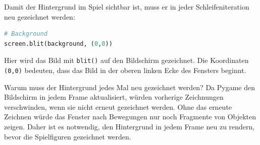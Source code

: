 \documentclass{article}
\begin{document}
Damit der Hintergrund im Spiel sichtbar ist, muss er in jeder Schleifeniteration neu gezeichnet werden:

\begin{lstlisting}[style=pythonstyle, language=Python]
# Background
screen.blit(background, (0,0))
\end{lstlisting}

Hier wird das Bild mit \texttt{blit()} auf den Bildschirm gezeichnet.  
Die Koordinaten \texttt{(0,0)} bedeuten, dass das Bild in der oberen linken Ecke des Fensters beginnt.

Warum muss der Hintergrund jedes Mal neu gezeichnet werden?
Da Pygame den Bildschirm in jedem Frame aktualisiert, würden vorherige Zeichnungen verschwinden, wenn sie nicht erneut gezeichnet werden. Ohne das erneute Zeichnen würde das Fenster nach Bewegungen nur noch Fragmente von Objekten zeigen. Daher ist es notwendig, den Hintergrund in jedem Frame neu zu rendern, bevor die Spielfiguren gezeichnet werden.
\pagebreak
\end{document}
